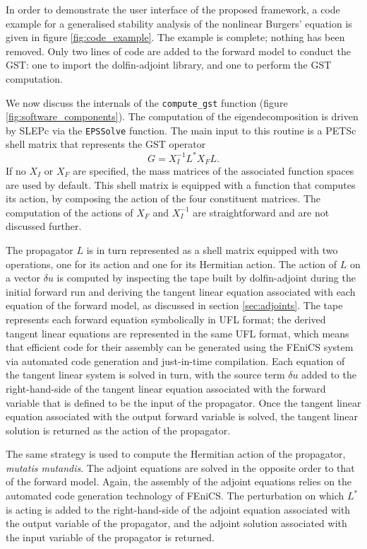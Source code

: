 \documentclass{siamltex}
\begin{document}
In order to demonstrate the user interface of the proposed framework, a code example for a generalised stability analysis of the nonlinear Burgers'
equation is given in figure \ref{fig:code_example}. The example is complete; nothing has been removed. Only two lines
of code are added to the forward model to conduct the GST: one to import the dolfin-adjoint library, and one to perform
the GST computation. 

We now discuss the internals of the \texttt{compute\_gst} function (figure \ref{fig:software_components}). The computation of the eigendecomposition
is driven by SLEPc via the \texttt{EPSSolve} function. The main input to this routine is a PETSc shell matrix that represents
the GST operator
\begin{equation}
G = X_I^{-1} L^* X_F L.
\end{equation}
If no $X_I$ or $X_F$ are specified, the mass matrices of the associated function spaces are used by default. This shell matrix
is equipped with a function that computes its action, by composing the action of the four constituent matrices.
The computation of the actions of $X_F$ and $X_I^{-1}$ are straightforward and are not discussed further.

The propagator $L$ is in turn represented as a shell matrix equipped with two operations, one for its
action and one for its Hermitian action.  The action of $L$ on a vector $\delta u$ is computed by inspecting
the tape built by dolfin-adjoint during the initial forward run and deriving the tangent linear equation associated with each equation of the
forward model, as discussed in section \ref{sec:adjoints}. The tape represents each forward equation symbolically in UFL format; the derived tangent
linear equations are represented in the same UFL format, which means that efficient code for their assembly
can be generated using the FEniCS system via automated code generation and just-in-time compilation. Each equation of the tangent linear system is
solved in turn, with the source term $\delta u$ added to the right-hand-side of the tangent linear equation
associated with the forward variable that is defined to be the input of the propagator. Once the tangent
linear equation associated with the output forward variable is solved, the tangent linear solution is returned
as the action of the propagator.

The same strategy is used to compute the Hermitian action of the propagator, \emph{mutatis mutandis}.
The adjoint equations are solved in the opposite order to that of the forward model. Again, the assembly of the
adjoint equations relies on the automated code generation technology of FEniCS. The perturbation on
which $L^*$ is acting is added to the right-hand-side of the adjoint equation associated with the output variable of the propagator, and the adjoint solution
associated with the input variable of the propagator is returned.
\end{document}
